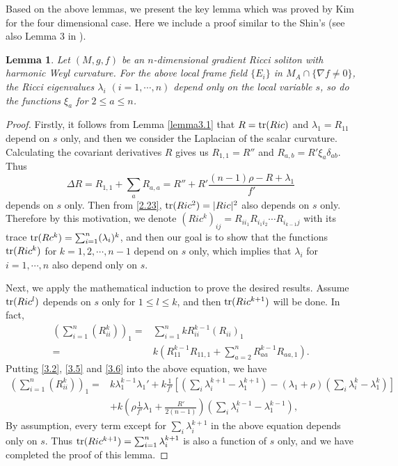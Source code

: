 \documentclass{amsart}
\newtheorem{lemma}[theorem]{Lemma}
\theoremstyle{definition}
\theoremstyle{remark}
\numberwithin{equation}{section}
\begin{document}
	Based on the above lemmas, we present the key lemma which was proved by Kim \cite{Kim} for the four dimensional case. 
	Here we include a proof 
	similar to the Shin's (see also Lemma 3 in \cite{S}).
	\begin{lemma} \label{lemma3.3}
		Let $(M, g, f)$ be an $n$-dimensional gradient Ricci soliton  with harmonic Weyl curvature.
		For the above local frame field $\{ E_i \}$ in $M_{A} \cap \{ \nabla f \neq 0 \}$,
		the Ricci eigenvalues $ \lambda_i $ $(i=1, \cdots ,n)$
		depend only on the local variable $s$, so do the functions $\xi_a$ for $2 \leq a\leq n$.
	\end{lemma}
	
	\begin{proof}
		Firstly, it follows from Lemma \ref{lemma3.1} that $R={\rm tr}(Ric)$ and $\lambda_1= R_{11}$ depend on $s$ only,
		and then we consider the Laplacian of the scalar curvature.	Calculating the covariant derivatives $R$ gives us
		$R_{1,1}=R''$ and $R_{a,b}=R' \xi_a \delta_{ab}$. Thus
	\[
	\Delta R=R_{1,1}+\sum\limits_{a}R_{a,a}=R''+R'\frac{(n-1)\rho-R+\lambda_1}{f'}
	\]
		depends on $s$ only. Then from \eqref{2.23},
		${\rm tr}(Ric^2)=|Ric|^{2}$ also depends on $s$ only.
		Therefore by this motivation, we denote
		$(Ric^k)_{ij}= R_{i i_1} R_{i_1 i_2} \cdots R_{i_{k-1} j}$
		with its trace ${\rm tr}(Rc^k)= \sum_{i=1}^n (\lambda_i)^k$,
       and then	our goal is to show that 
		the functions ${\rm tr}(Ric^k)$ for $k=1,2, \cdots, n-1$ depend on $s$ only, 
		which implies that $ \lambda_i $ for $i=1, \cdots ,n$ also depend only on $s$.
		
		Next, we apply the mathematical induction to prove the desired results.
		Assume ${\rm tr} (Ric^l)$ depends on $s$ only for $1\leq l \leq k$, 
		and then ${\rm tr}(Ric^{k+1})$ will be done.  In fact,
		\begin{align*}
		\left( \sum_{i=1}^n(R_{ii}^k)\right) _1=&\sum_{i=1}^nk R_{ii}^{k-1}(R_{ii})_1\\
		=&k\left(  R_{11}^{k-1}R_{11,1} + \sum_{a=2}^n R_{aa}^{k-1}R_{aa,1}\right).
		\end{align*}
		Putting \eqref{3.2}, \eqref{3.5} and \eqref{3.6} into the above equation,  we have
			\begin{align*}
		\left( \sum_{i=1}^n(R_{ii}^k)\right) _1
		=&k\lambda^{k-1}_1\lambda_1'
		+k\frac{1}{f'}\left[(\sum_{i}\lambda^{k+1}_i -\lambda^{k+1}_1)-(\lambda_1+\rho)(\sum_{i}\lambda^{k}_i -\lambda^{k}_1)\right]\\
		&+k\left( \rho\frac{1}{f'}\lambda_1+\frac{R'}{2(n-1)}\right)\left(\sum_{i}\lambda^{k-1}_i -\lambda^{k-1}_1\right),
		\end{align*}
		By assumption, every term except for $\sum_{i}\lambda_{i}^{k+1}$ in the above equation depends only on $s$.
		Thus ${\rm tr}(Ric^{k+1})=\sum_{i=1}^n \lambda_{i}^{k+1} $ is also a function of $s$ only, 
		and we have completed the proof of this lemma.
	\end{proof}
	
\end{document}
